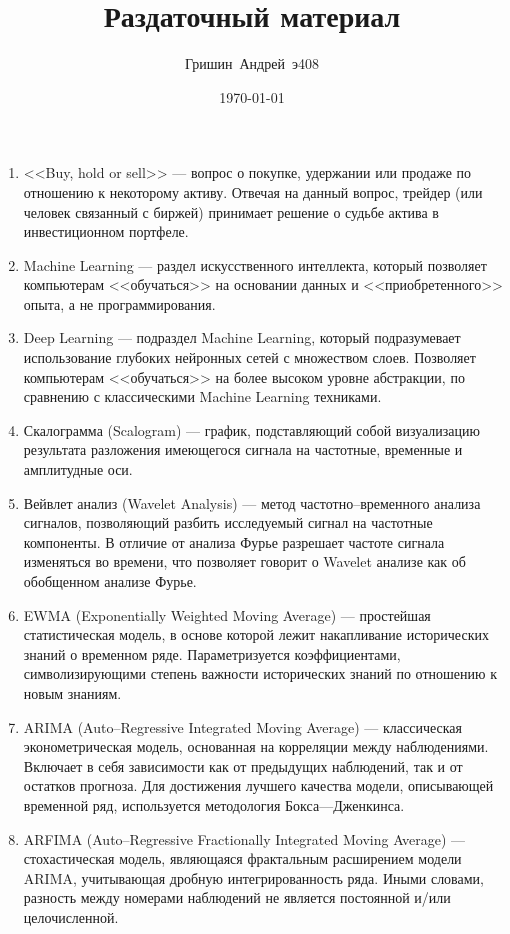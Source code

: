 \documentclass[a4paper, 12pt]{article}
\title{Раздаточный материал}
\author{Гришин~Андрей~э408}
\date{\today}
\begin{document}
	\maketitle
	\begin{enumerate}
		\item <<Buy, hold or sell>> --- вопрос о покупке, удержании или продаже по отношению к некоторому активу. Отвечая на данный вопрос, трейдер (или человек связанный с биржей) принимает решение о судьбе актива в инвестиционном портфеле.
		\item Machine Learning --- раздел искусственного интеллекта, который позволяет компьютерам <<обучаться>> на основании данных и <<приобретенного>> опыта, а не программирования.
		\item Deep Learning --- подраздел Machine Learning, который подразумевает использование глубоких нейронных сетей с множеством слоев. Позволяет компьютерам <<обучаться>> на более высоком уровне абстракции, по сравнению с классическими Machine Learning техниками.
		\item Скалограмма (Scalogram) ---  график, подставляющий собой визуализацию результата разложения имеющегося сигнала на частотные, временные и амплитудные оси.
		\item Вейвлет анализ (Wavelet Analysis) --- метод частотно--временного анализа сигналов, позволяющий разбить исследуемый сигнал на частотные компоненты. В отличие от анализа Фурье разрешает частоте сигнала изменяться во времени, что позволяет говорит о Wavelet анализе как об обобщенном анализе Фурье.
		\item EWMA (Exponentially Weighted Moving Average) --- простейшая статистическая модель, в основе которой лежит накапливание исторических знаний о временном ряде. Параметризуется коэффициентами, символизирующими степень важности исторических знаний по отношению к новым знаниям.
		\item ARIMA (Auto--Regressive Integrated Moving Average) --- классическая эконометрическая модель, основанная на корреляции между наблюдениями. Включает в себя зависимости как от предыдущих наблюдений, так и от остатков прогноза. Для достижения лучшего качества модели, описывающей временной ряд, используется методология Бокса---Дженкинса.
		\item ARFIMA (Auto--Regressive Fractionally Integrated Moving Average) --- стохастическая модель, являющаяся фрактальным расширением модели ARIMA, учитывающая дробную интегрированность ряда. Иными словами, разность между номерами наблюдений не является постоянной и/или целочисленной.

\end{enumerate}
\end{document}
